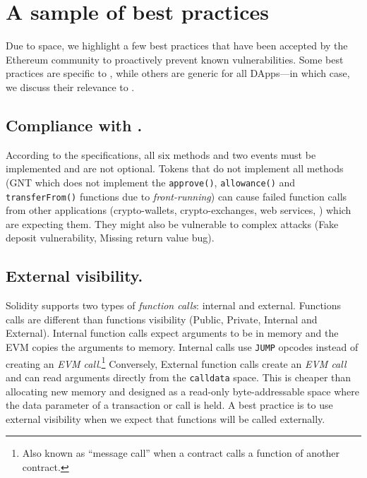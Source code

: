 
\section{A sample of best practices}\label{sec:bp}

Due to space, we highlight a few best practices that have been accepted by the Ethereum community to proactively prevent known vulnerabilities\cite{TokenBP}. Some best practices are specific to \erc, while others are generic for all DApps---in which case, we discuss their relevance to \erc.

\subsection{Compliance with \erc.}\label{subsec:compl}

According to the \erc specifications, all six methods and two events must be implemented and are not optional. {\blue Tokens that do not implement all methods (\eg GNT which does not implement the \texttt{approve()}, \texttt{allowance()} and \texttt{transferFrom()} functions due to \textit{front-running}\cite{GNT}) can cause failed function calls from other applications (\ie crypto-wallets, crypto-exchanges, web services, \etc) which are expecting them. They might also be vulnerable to complex attacks (\eg Fake deposit vulnerability\cite{DEPOSafe}, Missing return value bug\cite{ErcBug}).}

\subsection{External visibility.}\label{subsec:external}

Solidity supports two types of \textit{function calls}: internal and external\cite{SolidityDoc}. { \blue Functions calls are different than functions visibility (\ie Public, Private, Internal and External).} Internal function calls expect arguments to be in memory and the EVM copies the arguments to memory. Internal calls use \texttt{JUMP} opcodes instead of creating an \textit{EVM call}.\footnote{Also known as ``message call'' when a contract calls a function of another contract.} Conversely, External function calls create an \textit{EVM call} and can read arguments directly from the \texttt{calldata} space. This is cheaper than allocating new memory and designed as a read-only byte-addressable space where the data parameter of a transaction or call is held\cite{EthInDepth}. A best practice is to use external visibility when we expect that functions will be called externally.

